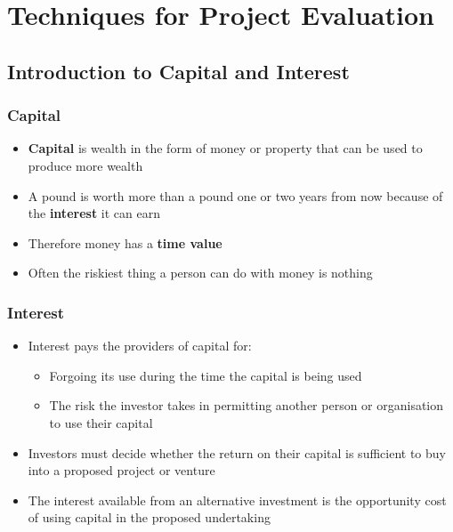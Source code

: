 \chapter{Techniques for Project Evaluation}
\section{Introduction to Capital and Interest}
\subsection{Capital}
\begin{itemize}
  \item \textbf{Capital} is wealth in the form of money or property that can be used to produce more wealth
  \item A pound is worth more than a pound one or two years from now because of the \textbf{interest} it can earn
  \item Therefore money has a \textbf{time value}
  \item Often the riskiest thing a person can do with money is nothing
\end{itemize}
\subsection{Interest}
\begin{itemize}
  \item Interest pays the providers of capital for:
        \begin{itemize}
          \item Forgoing its use during the time the capital is being used
          \item The risk the investor takes in permitting another person or organisation to use their capital
        \end{itemize}
  \item Investors must decide whether the return on their capital is sufficient to buy into a proposed project or venture
  \item The interest available from an alternative investment is the opportunity cost of using capital in the proposed undertaking
\end{itemize}
